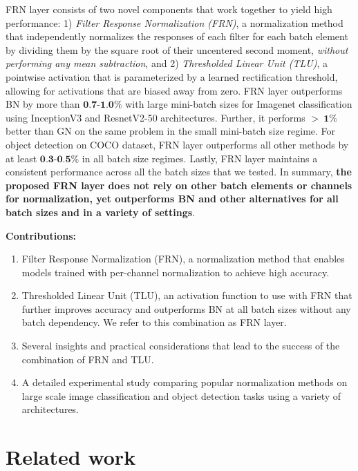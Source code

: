 \documentclass[10pt,twocolumn,letterpaper]{article}
\newcommand{\orelu}{TLU}
\newcommand{\papername}{FRN}
\newcommand{\batchnorm}{BN}
\newcommand{\momentnorm}{FRN}
\begin{document}
\papername{} layer consists of two novel components that work together to yield high performance: 1) \emph{Filter Response Normalization (\papername{})}, a normalization method that independently normalizes the responses of each filter for each batch element by dividing them by the square root of their uncentered second moment, \emph{without performing any mean subtraction}, and 2) \emph{Thresholded Linear Unit (\orelu{})}, a pointwise activation that is parameterized by a learned rectification threshold, allowing for activations that are biased away from zero. \papername{} layer outperforms \batchnorm{} by more than $\textbf{0.7-1.0}\%$ with large mini-batch sizes for Imagenet classification using InceptionV3 and ResnetV2-50 architectures. Further, it performs $>~\textbf{1}\%$ better than GN on the same problem in the small mini-batch size regime. For object detection on COCO dataset, \papername{} layer outperforms all other methods by at least $\textbf{0.3-0.5}\%$ in all batch size regimes. Lastly, \papername{} layer maintains a consistent performance across all the batch sizes that we tested. In summary, \textbf{the proposed \papername{} layer does not rely on other batch elements or channels for normalization, yet outperforms \batchnorm{} and other alternatives for all batch sizes and in a variety of settings}.

\medskip
\noindent
\textbf{Contributions: }

\begin{enumerate}[leftmargin=*,noitemsep]
\item Filter Response Normalization (FRN), a normalization method that enables models trained with per-channel normalization to achieve high accuracy.
\item Thresholded Linear Unit (TLU), an activation function to use with FRN that further improves accuracy and outperforms \batchnorm{} at all batch sizes without any batch dependency. We refer to this combination as \papername{} layer.
\item Several insights and practical considerations that lead to the success of the combination of \momentnorm{} and \orelu{}.
\item A detailed experimental study comparing popular normalization methods on large scale image classification and object detection tasks using a variety of architectures.
\end{enumerate}



\section{Related work}
\end{document}
